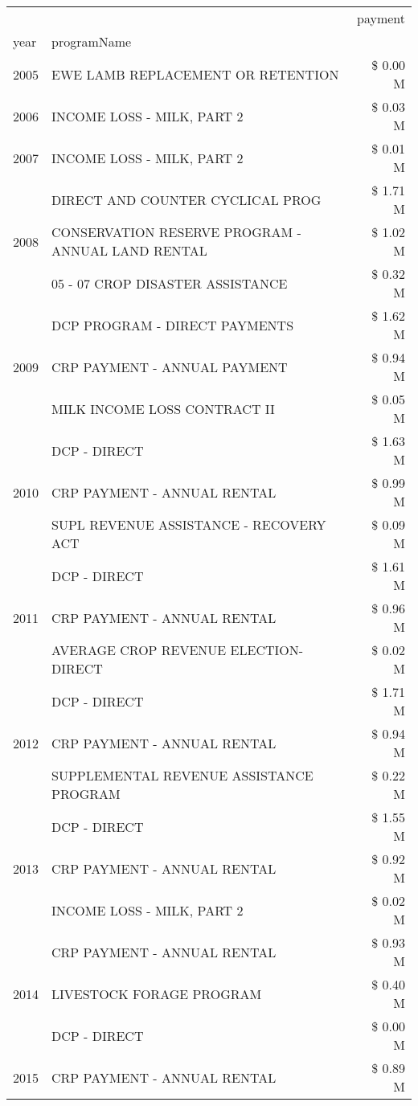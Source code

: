 \begin{tabular}{llr}
\toprule
 &  & payment \\
year & programName &  \\
\midrule
2005 & EWE LAMB REPLACEMENT OR RETENTION & \$ 0.00 M \\
\cline{1-3}
2006 & INCOME LOSS - MILK, PART 2 & \$ 0.03 M \\
\cline{1-3}
2007 & INCOME LOSS - MILK, PART 2 & \$ 0.01 M \\
\cline{1-3}
\multirow[t]{3}{*}{2008} & DIRECT AND COUNTER CYCLICAL PROG & \$ 1.71 M \\
 & CONSERVATION RESERVE PROGRAM - ANNUAL LAND RENTAL & \$ 1.02 M \\
 & 05 - 07 CROP DISASTER ASSISTANCE & \$ 0.32 M \\
\cline{1-3}
\multirow[t]{3}{*}{2009} & DCP PROGRAM - DIRECT PAYMENTS & \$ 1.62 M \\
 & CRP PAYMENT - ANNUAL PAYMENT & \$ 0.94 M \\
 & MILK INCOME LOSS CONTRACT II & \$ 0.05 M \\
\cline{1-3}
\multirow[t]{3}{*}{2010} & DCP - DIRECT & \$ 1.63 M \\
 & CRP PAYMENT - ANNUAL RENTAL & \$ 0.99 M \\
 & SUPL REVENUE ASSISTANCE - RECOVERY ACT & \$ 0.09 M \\
\cline{1-3}
\multirow[t]{3}{*}{2011} & DCP - DIRECT & \$ 1.61 M \\
 & CRP PAYMENT - ANNUAL RENTAL & \$ 0.96 M \\
 & AVERAGE CROP REVENUE ELECTION-DIRECT & \$ 0.02 M \\
\cline{1-3}
\multirow[t]{3}{*}{2012} & DCP - DIRECT & \$ 1.71 M \\
 & CRP PAYMENT - ANNUAL RENTAL & \$ 0.94 M \\
 & SUPPLEMENTAL REVENUE ASSISTANCE PROGRAM & \$ 0.22 M \\
\cline{1-3}
\multirow[t]{3}{*}{2013} & DCP - DIRECT & \$ 1.55 M \\
 & CRP PAYMENT - ANNUAL RENTAL & \$ 0.92 M \\
 & INCOME LOSS - MILK, PART 2 & \$ 0.02 M \\
\cline{1-3}
\multirow[t]{3}{*}{2014} & CRP PAYMENT - ANNUAL RENTAL & \$ 0.93 M \\
 & LIVESTOCK FORAGE PROGRAM & \$ 0.40 M \\
 & DCP - DIRECT & \$ 0.00 M \\
\cline{1-3}
\multirow[t]{3}{*}{2015} & CRP PAYMENT - ANNUAL RENTAL & \$ 0.89 M \\

\end{tabular}
